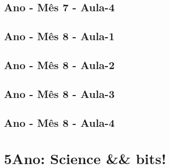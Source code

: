 \begin{multicols}{2}
\section[\sffamily 4\textordmasculine\space Ano - M\^{e}s 7 - Aula-4]{\textordmasculine\space Ano - M\^{e}s 7 - Aula-4}


\section[\sffamily 4\textordmasculine\space Ano - M\^{e}s 8 - Aula-1]{\textordmasculine\space Ano - M\^{e}s 8 - Aula-1}


\section[\sffamily 4\textordmasculine\space Ano - M\^{e}s 8 - Aula-2]{\textordmasculine\space Ano - M\^{e}s 8 - Aula-2}


\section[\sffamily 4\textordmasculine\space Ano - M\^{e}s 8 - Aula-3]{\textordmasculine\space Ano - M\^{e}s 8 - Aula-3}


\section[\sffamily 4\textordmasculine\space Ano - M\^{e}s 8 - Aula-4]{\textordmasculine\space Ano - M\^{e}s 8 - Aula-4}


\end{multicols}
\chapter[ 5\textordmasculine\space Ano: 
Science \&\& bits!]{5\textordmasculine\space Ano: Science \&\& bits!}



\pagebreak

